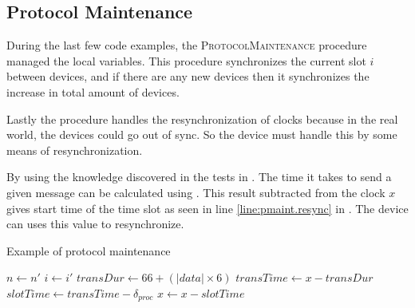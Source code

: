 \subsection{Protocol Maintenance}\label{subsec:protocolmaintanaince}
During the last few code examples, the \textsc{ProtocolMaintenance} procedure managed the local variables. 
This procedure synchronizes the current slot $i$ between devices, and if there are any new devices then it synchronizes the increase in total amount of devices.

Lastly the procedure handles the resynchronization of clocks because in the real world, the devices could go out of sync. 
So the  device must handle this by some means of resynchronization. 

By using the knowledge discovered in the tests in . 
The time it takes to send a given message can be calculated using . 
This result subtracted from the clock $x$ gives start time of the time slot as seen in line \ref{line:pmaint.resync} in . 
The device can uses this value to resynchronize.

\begin{algorithm}[ht]
\caption{Example of protocol maintenance}
\label{lst:maintaniance}
\begin{algorithmic}[1]
        \State $n \gets n'$
    \EndIf
    \State $i \gets i'$
    \State $transDur \gets 66 + (|data| \times 6)$ 
    \State $transTime \gets x - transDur$ 
    \State $slotTime \gets transTime - \delta_{proc}$ 
    \State $x \gets x - slotTime$ \label{line:pmaint.resync}         
\EndProcedure        
\end{algorithmic}    
\end{algorithm} 
